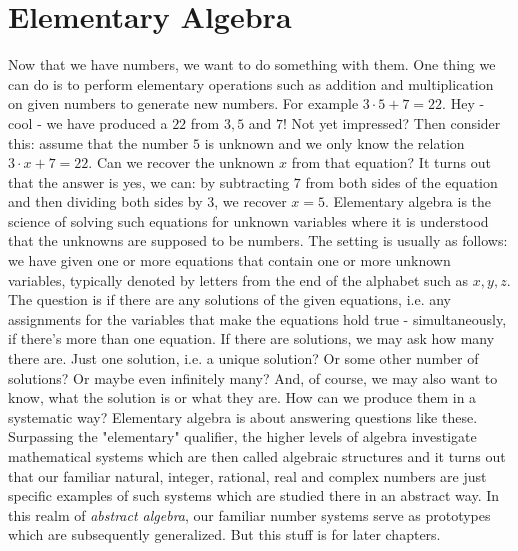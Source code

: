 \section{Elementary Algebra}
Now that we have numbers, we want to do something with them. One thing we can do is to perform elementary operations such as addition and multiplication on given numbers to generate new numbers. For example $3 \cdot 5 + 7 = 22$. Hey - cool - we have produced a $22$ from $3,5$ and $7$! Not yet impressed? Then consider this: assume that the number $5$ is unknown and we only know the relation $3 \cdot x + 7 = 22$. Can we recover the unknown $x$ from that equation? It turns out that the answer is yes, we can: by subtracting $7$ from both sides of the equation and then dividing both sides by $3$, we recover $x = 5$. Elementary algebra is the science of solving such equations for unknown variables where it is understood that the unknowns are supposed to be numbers. The setting is usually as follows: we have given one or more equations that contain one or more unknown variables, typically denoted by letters from the end of the alphabet such as $x,y,z$. The question is if there are any solutions of the given equations, i.e. any assignments for the variables that make the equations hold true - simultaneously, if there's more than one equation. If there are solutions, we may ask how many there are. Just one solution, i.e. a unique solution? Or some other number of solutions? Or maybe even infinitely many? And, of course, we may also want to know, what the solution is or what they are. How can we produce them in a systematic way? Elementary algebra is about answering questions like these. Surpassing the "elementary" qualifier, the higher levels of algebra investigate mathematical systems which are then called algebraic structures and it turns out that our familiar natural, integer, rational, real and complex numbers are just specific examples of such systems which are studied there in an abstract way. In this realm of \emph{abstract algebra}, our familiar number systems serve as prototypes which are subsequently generalized. But this stuff is for later chapters. 





